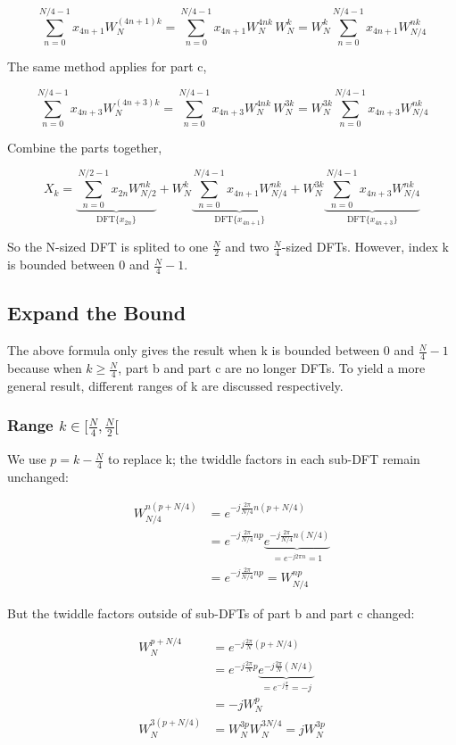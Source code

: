 \documentclass[a4paper]{report}
\begin{document}
	\[\sum^{N/4-1}_{n=0} x_{4n+1} W_{N}^{(4n+1)k}
	= \sum^{N/4-1}_{n=0} x_{4n+1} W_{N}^{4nk} \, W_{N}^{k}
	= W_{N}^{k}\sum^{N/4-1}_{n=0} x_{4n+1} W_{N/4}^{nk}\]
	
	The same method applies for part c,
	
	\[\sum^{N/4-1}_{n=0} x_{4n+3} W_{N}^{(4n+3)k}
	= \sum^{N/4-1}_{n=0} x_{4n+3} W_{N}^{4nk} \, W_{N}^{3k}
	= W_{N}^{3k}\sum^{N/4-1}_{n=0} x_{4n+3} W_{N/4}^{nk}\]
	
	Combine the parts together,
	
	\[X_k = \underbrace{\sum_{n=0}^{N/2-1} x_{2n} W_{N/2}^{nk}}_{\text{DFT}\{x_{2n}\}}
          + W_N^k \underbrace{\sum_{n=0}^{N/4-1} x_{4n+1} W_{N/4}^{nk}}_{\text{DFT}\{x_{4n+1}\}}
          + W_N^{3k} \underbrace{\sum_{n=0}^{N/4-1} x_{4n+3} W_{N/4}^{nk}}_{\text{DFT}\{x_{4n+3}\}}\]
	
	So the N-sized DFT is splited to one $\frac{N}{2}$ and two $\frac{N}{4}$-sized DFTs. However, index k is bounded between 0 and $\frac{N}{4}-1$.

\subsection{Expand the Bound} \indent

	The above formula only gives the result when k is bounded between 0 and $\frac{N}{4}-1$ because when $k \geq \frac{N}{4}$, part b and part c are no longer DFTs. To yield a more general result, different ranges of k are discussed respectively.

\subsubsection{Range $k \in [\frac{N}{4}, \frac{N}{2}[$} \indent

	We use $p = k - \frac{N}{4}$ to replace k; the twiddle factors in each sub-DFT remain unchanged:
	
	\[\begin{split}
	W_{N/4}^{n(p+N/4)} & = e^{-j\frac{2\pi}{N/4}n(p+N/4)} \\
					   & = e^{-j\frac{2\pi}{N/4}np} \underbrace{e^{-j\frac{2\pi}{N/4}n(N/4)}}_{= e^{-j2\pi n} = 1} \\
					   & = e^{-j\frac{2\pi}{N/4}np} = W_{N/4}^{np}
	\end{split}\]

	But the twiddle factors outside of sub-DFTs of part b and part c changed:

	\[\begin{split}
	W_N^{p+N/4} & = e^{-j\frac{2\pi}{N}(p+N/4)} \\
				& = e^{-j\frac{2\pi}{N}p} \underbrace{e^{-j\frac{2\pi}{N}(N/4)}}_{= e^{-j\frac{\pi}{2}} = -j} \\
				& = -j W_{N}^p \\
 W_N^{3(p+N/4)} & = W_N^{3p} W_N^{3N/4} = j W_N^{3p}
	\end{split}\]
\end{document}
